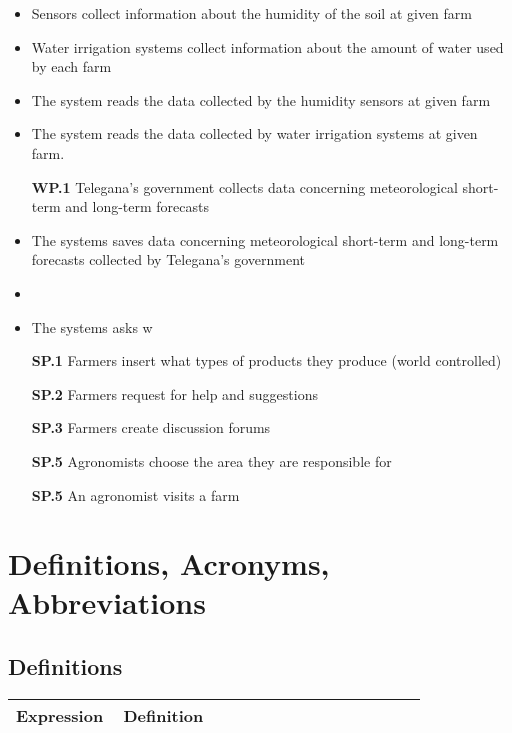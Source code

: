 \begin{itemize}
    \item Sensors collect information about the humidity of the soil at given farm
    \item Water irrigation systems collect information about the amount of water used by each farm
    \item The system reads the data collected by the humidity sensors at given farm
    \item The system reads the data collected by water irrigation systems at given farm.
    \item [\textbf{WP.1}] Telegana's government collects data concerning meteorological short-term and long-term forecasts
    \item The systems saves data concerning meteorological short-term and long-term forecasts collected by Telegana's government
    \item 
    \item The systems asks w
    \item [\textbf{SP.1}] Farmers insert what types of products they produce (world controlled) %
    \item [\textbf{SP.2}] Farmers request for help and suggestions 
    \item [\textbf{SP.3}] Farmers create discussion forums 
    \item [\textbf{SP.5}] Agronomists choose the area they are responsible for  %
    \item [\textbf{SP.5}] An agronomist visits a farm 
\end{itemize}

\section{Definitions, Acronyms, Abbreviations}

\subsection{Definitions}

\begin{center}
	\begin{tabular}{@{}p{0.25\linewidth} p{0.71\linewidth}@{}}
		\toprule
		\textbf{Expression} & \textbf{Definition}\\
		\midrule
	\end{tabular}
\end{center}

